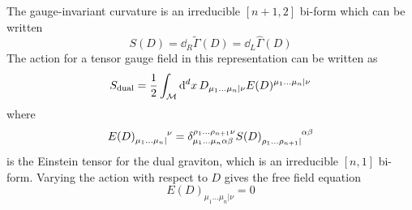 The gauge-invariant curvature is an irreducible $[n+1,2]$ bi-form which can be written
\begin{equation}
    S(D) = \dd_R \tilde{\Gamma}(D) = \dd_L \hat{\Gamma}(D)
\end{equation}
The action \cite{Curtright:1980yk} for a tensor gauge field in this representation can be written as \cite{Medeiros2003ExoticDuality}
\begin{equation}\label{eq:S_dual}
    S_{\text{dual}} = \frac{1}{2} \int_{\mathcal{M}} \dd[d]{x} D_{\mu_1\dots\mu_n|\nu} E(D)^{\mu_1\dots\mu_n|\nu}
\end{equation}
where 
\begin{equation}
    E(D)\indices{_{\mu_1\dots\mu_n|}^\nu} = \delta_{\mu_1\dots\mu_n\alpha\beta}^{\rho_1\dots\rho_{n+1}\nu} S(D)\indices{_{\rho_1\dots\rho_{n+1}|}^{\alpha\beta}}
\end{equation}
is the Einstein tensor for the dual graviton, which is an irreducible $[n,1]$ bi-form. Varying the action with respect to $D$ gives the free field equation
\begin{equation}
    E(D)_{\mu_1\dots\mu_n|\nu} = 0
\end{equation}

